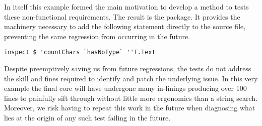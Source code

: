 In itself this example formed the main motivation to develop a method to tests these non-functional requirements.
The result is the  package. It provides the machinery necessary to add the following statement
directly to the source file, preventing the same regression from occurring in the future.

\begin{verbatim}
inspect $ 'countChars `hasNoType` ''T.Text
\end{verbatim}

Despite preemptively saving us from future regressions, the tests do not address the skill and fines required to identify
and patch the underlying issue. In this very example the final core will have undergone many in-linings producing
over 100 lines to painfully sift through without little more ergonomics than a string search. Moreover, we risk having
to repeat this work in the future when diagnosing what lies at the origin of any such test failing in the future.
